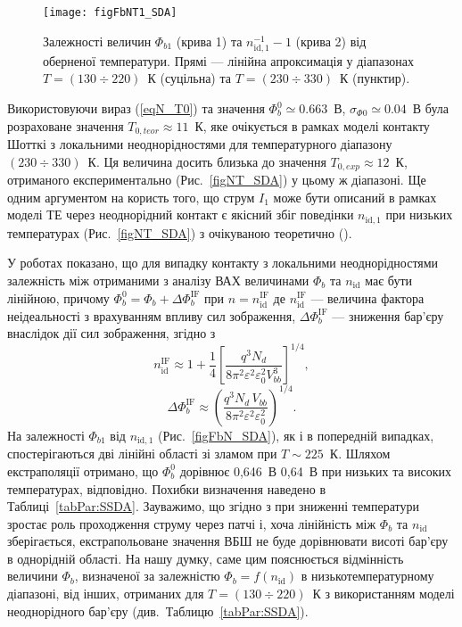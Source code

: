 \begin{figure}
\center
\texttt{[image: figFbNT1\_SDA]}
\caption{\label{figFbNT1_SDA}
Залежності величин $\Phi_{b1}$ (крива 1) та $n_{\mathrm{id},1}^{-1}-1$ (крива 2) від оберненої температури.
Прямі --- лінійна апроксимація у діапазонах $T=(130\div220)$~К (суцільна) та $T=(230\div330)$~К (пунктир).
}%
\end{figure}

Використовуючи вираз (\ref{eqN_T0}) та значення $\Phi_{b}^0\simeq0.663$~В, $\sigma_{\Phi0}\simeq0.04$~В
була розраховане значення $T_{0,teor}\approx11$~К, яке очікується в рамках моделі контакту Шотткі з локальними неоднорідностями
для температурного діапазону $(230\div330)$~К.
Ця величина досить близька до значення $T_{0,exp}\approx12$~К, отриманого експериментально (Рис.~\ref{figNT_SDA}) у цьому ж діапазоні.
Ще одним аргументом на користь того, що струм $I_1$ може бути описаний в рамках моделі ТЕ через неоднорідний контакт є якісний збіг
поведінки $n_{\mathrm{id},1}$ при низьких температурах (Рис.~\ref{figNT_SDA}) з очікуваною теоретично (\cite[Fig.11(b)]{Tung:PhysRev}).


У роботах  \cite{Tung:PhysRev,Sarpatwari,Schmitsdorf} показано, що для випадку
контакту з локальними неоднорідностями залежність між отриманими з аналізу ВАХ величинами $\Phi_b$ та $n_\mathrm{id}$ має бути лінійною,
причому $\Phi_{b}^0=\Phi_{b}+\Delta\Phi_b^\mathrm{IF}$ при $n=n_\mathrm{id}^\mathrm{IF}$
де $n_\mathrm{id}^\mathrm{IF}$ ---  величина фактора неідеальності з врахуванням впливу сил зображення,
$\Delta\Phi_b^\mathrm{IF}$ --- зниження бар'єру внаслідок дії сил зображення,
згідно з \cite{Sarpatwari}
\begin{equation}\label{eqN:IF}
n_\mathrm{id}^\mathrm{IF}\approx 1+\frac14\left[\frac{q^3N_d}{8\pi^2\varepsilon^2\varepsilon_0^2V^3_{bb}}\right]^{1/4},
\end{equation}
\begin{equation}\label{eqFb:IF}
\Delta\Phi_b^\mathrm{IF}\approx \left(\frac{q^3N_d\,V_{bb}}{8\pi^2\varepsilon^2\varepsilon_0^2}\right)^{1/4}.
\end{equation}
На залежності $\Phi_{b1}$ від $n_{\mathrm{id},1}$ (Рис.~\ref{figFbN_SDA}), як і в попередній випадках,
спостерігаються дві лінійні області зі зламом при $T\sim225$~К.
Шляхом екстраполяції отримано, що $\Phi_b^0$ дорівнює 0,646~В 0,64~В при низьких та високих температурах, відповідно.
Похибки визначення наведено в Таблиці~\ref{tabPar:SSDA}.
Зауважимо, що згідно з \cite{Sarpatwari,Schmitsdorf}
при зниженні температури зростає роль проходження струму через патчі і, хоча лінійність між  $\Phi_b$ та $n_\mathrm{id}$ зберігається,
екстрапольоване значення ВБШ не буде дорівнювати висоті бар'єру в однорідній області.
На нашу думку, саме цим пояснюється відмінність величини $\Phi_b$, визначеної за залежністю
$\Phi_b=f(n_\mathrm{id})$ в низькотемпературному діапазоні, від інших,
отриманих для $T=(130\div220)$~К з використанням моделі неоднорідного бар'єру (див.~Таблицю~\ref{tabPar:SSDA}).

